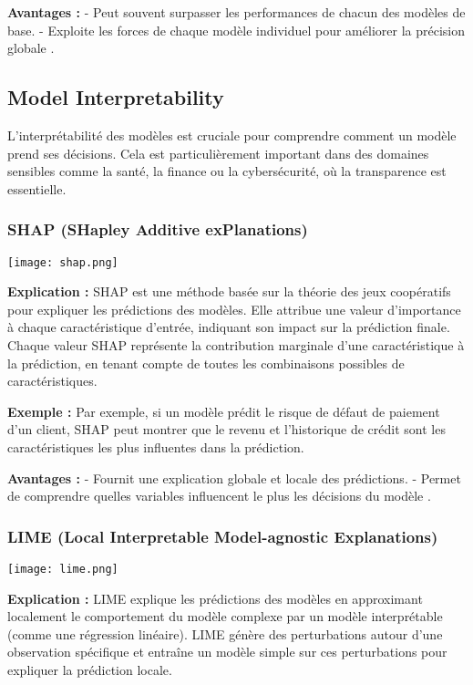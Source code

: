 \documentclass[10pt,a4paper]{article}
\begin{document}
\textbf{Avantages :}
- Peut souvent surpasser les performances de chacun des modèles de base.
- Exploite les forces de chaque modèle individuel pour améliorer la précision globale \cite{wikipedia_ensemble}.


\subsection*{Model Interpretability}

L'interprétabilité des modèles est cruciale pour comprendre comment un modèle prend ses décisions. Cela est particulièrement important dans des domaines sensibles comme la santé, la finance ou la cybersécurité, où la transparence est essentielle.

\subsubsection*{SHAP (SHapley Additive exPlanations)}

\texttt{[image: shap.png]}

\textbf{Explication :}
SHAP est une méthode basée sur la théorie des jeux coopératifs pour expliquer les prédictions des modèles. Elle attribue une valeur d'importance à chaque caractéristique d'entrée, indiquant son impact sur la prédiction finale. Chaque valeur SHAP représente la contribution marginale d'une caractéristique à la prédiction, en tenant compte de toutes les combinaisons possibles de caractéristiques.

\textbf{Exemple :}
Par exemple, si un modèle prédit le risque de défaut de paiement d'un client, SHAP peut montrer que le revenu et l'historique de crédit sont les caractéristiques les plus influentes dans la prédiction.

\textbf{Avantages :}
- Fournit une explication globale et locale des prédictions.
- Permet de comprendre quelles variables influencent le plus les décisions du modèle \cite{ml_trends}.

\subsubsection*{LIME (Local Interpretable Model-agnostic Explanations)}

\texttt{[image: lime.png]}

\textbf{Explication :}
LIME explique les prédictions des modèles en approximant localement le comportement du modèle complexe par un modèle interprétable (comme une régression linéaire). LIME génère des perturbations autour d'une observation spécifique et entraîne un modèle simple sur ces perturbations pour expliquer la prédiction locale.
\end{document}
